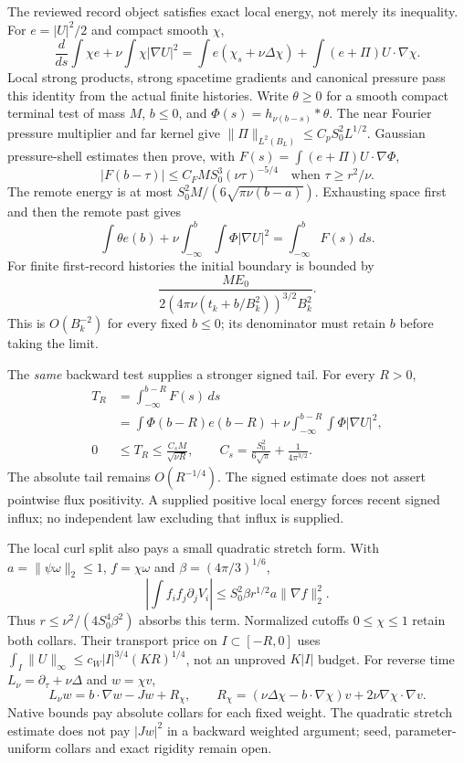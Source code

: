 \documentclass[11pt]{article}
\begin{document}
The reviewed record object satisfies exact local energy, not merely its
inequality. For $e=|U|^2/2$ and compact smooth $\chi$,
\[
 \frac{d}{ds}\int\chi e+\nu\int\chi|\nabla U|^2
 =\int e(\chi_s+\nu\Delta\chi)+\int(e+\Pi)U\cdot\nabla\chi.
\]
Local strong products, strong spacetime gradients and canonical pressure
pass this identity from the actual finite histories. Write $\theta\ge0$
for a smooth compact terminal test of mass $M$, $b\le0$, and
$\Phi(s)=h_{\nu(b-s)}*\theta$. The near Fourier pressure multiplier and
far kernel give $\|\Pi\|_{L^2(B_L)}\le C_pS_0^2L^{1/2}$.
Gaussian pressure-shell estimates then prove, with
$F(s)=\int(e+\Pi)U\cdot\nabla\Phi$,
\[
 |F(b-\tau)|\le C_FMS_0^3(\nu\tau)^{-5/4}
 \quad\text{when }\tau\ge r^2/\nu.
\]
The remote energy is at most $S_0^2M/(6\sqrt{\pi\nu(b-a)})$.
Exhausting space first and then the remote past gives
\[
 \int\theta e(b)+\nu\int_{-\infty}^b\!\int\Phi|\nabla U|^2
   =\int_{-\infty}^b F(s)\,ds.
\]
For finite first-record histories the initial boundary is bounded by
\[
 \frac{ME_0}{2(4\pi\nu(t_k+b/B_k^2))^{3/2}B_k^2}.
\]
This is $O(B_k^{-2})$ for every fixed $b\le0$; its denominator must retain
$b$ before taking the limit.

The \emph{same} backward test supplies a stronger signed tail. For every
$R>0$,
\[
 \begin{aligned}
 T_R&=\int_{-\infty}^{b-R}F(s)\,ds\\
 &=\int\Phi(b-R)e(b-R)
   +\nu\int_{-\infty}^{b-R}\!\int\Phi|\nabla U|^2,\\
 0&\le T_R\le\frac{C_sM}{\sqrt{\nu R}},\qquad
 C_s=\frac{S_0^2}{6\sqrt\pi}+\frac1{4\pi^{3/2}}.
 \end{aligned}
\]
The absolute tail remains $O(R^{-1/4})$. The signed estimate does not
assert pointwise flux positivity. A supplied positive local energy forces
recent signed influx; no independent law excluding that influx is supplied.

The local curl split also pays a small quadratic stretch form. With
$a=\|\psi\omega\|_2\le1$, $f=\chi\omega$ and
$\beta=(4\pi/3)^{1/6}$,
\[
 \left|\int f_if_j\partial_jV_i\right|
 \le S_0^2\beta r^{1/2}a\|\nabla f\|_2^2.
\]
Thus $r\le\nu^2/(4S_0^4\beta^2)$ absorbs this term. Normalized cutoffs
$0\le\chi\le1$ retain both collars. Their transport price on
$I\subset[-R,0]$ uses $\int_I\|U\|_\infty\le
c_W|I|^{3/4}(KR)^{1/4}$, not an unproved $K|I|$ budget.
For reverse time $L_\nu=\partial_\tau+\nu\Delta$ and $w=\chi v$,
\[
 L_\nu w=b\cdot\nabla w-Jw+R_\chi,\qquad
 R_\chi=(\nu\Delta\chi-b\cdot\nabla\chi)v
              +2\nu\nabla\chi\cdot\nabla v.
\]
Native bounds pay absolute collars for each fixed weight. The quadratic
stretch estimate does not pay $|Jw|^2$ in a backward weighted argument;
seed, parameter-uniform collars and exact rigidity remain open.
\end{document}
